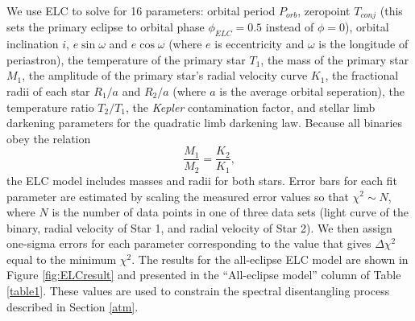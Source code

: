 We use ELC to solve for 16 parameters: orbital period $P_{orb}$, zeropoint $T_{conj}$ (this sets the primary eclipse to orbital phase $\phi_{ELC} = 0.5$ instead of $\phi = 0$), orbital inclination $i$, $e \sin \omega$ and $e \cos \omega$ (where $e$ is eccentricity and $\omega$ is the longitude of periastron), the temperature of the primary star $T_1$, the mass of the primary star $M_1$, the amplitude of the primary star's radial velocity curve $K_1$, the fractional radii of each star $R_1/a$ and $R_2/a$ (where $a$ is the average orbital seperation), the temperature ratio $T_2/T_1$, the \emph{Kepler} contamination factor, and stellar limb darkening parameters for the quadratic limb darkening law. Because all binaries obey the relation
\begin{equation}
\frac{M_1}{M_2} = \frac{K_2}{K_1},
\end{equation}
the ELC model includes masses and radii for both stars. Error bars for each fit parameter are estimated by scaling the measured error values so that $\chi^2 \sim N$, where $N$ is the number of data points in one of three data sets (light curve of the binary, radial velocity of Star 1, and radial velocity of Star 2). We then assign one-sigma errors for each parameter corresponding to the value that gives $\Delta \chi^2$ equal to the minimum $\chi^2$. The results for the all-eclipse ELC model are shown in Figure \ref{fig:ELCresult} and presented in the ``All-eclipse model'' column of Table \ref{table1}. These values are used to constrain the spectral disentangling process described in Section \ref{atm}.